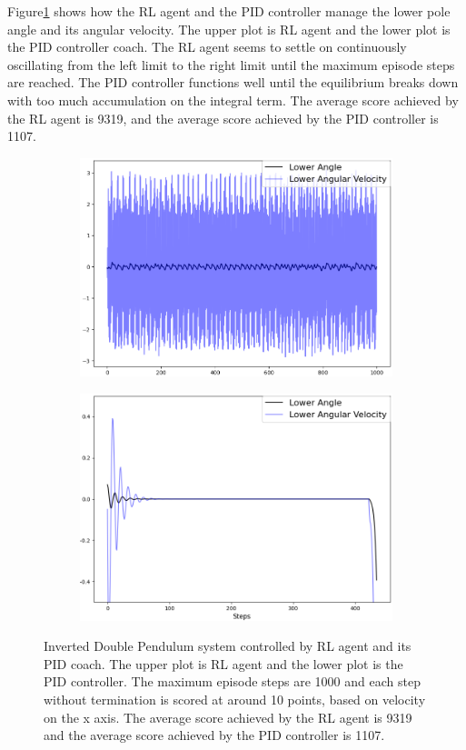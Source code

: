 \documentclass[journal]{IEEEtran}
\begin{document}
Figure\ref{fig:double} shows how the RL agent and the PID controller manage the lower pole angle and its angular velocity. The upper plot is RL agent and the lower plot is the PID controller coach. The RL agent seems to settle on continuously oscillating from the left limit to the right limit until the maximum episode steps are reached. The PID controller functions well until the equilibrium breaks down with too much accumulation on the integral term. The average score achieved by the RL agent is 9319, and the average score achieved by the PID controller is 1107.
\begin{figure}
\centering
\begin{subfigure}{0.3\textwidth}
  \centering
  \includegraphics[width=\linewidth]{double_RL.png}
\end{subfigure}%
\hfill
\begin{subfigure}{.3\textwidth}
  \centering
  \includegraphics[width=\linewidth]{double_PID.png}
\end{subfigure}
\caption{Inverted Double Pendulum system controlled by RL agent and its PID coach. The upper plot is RL agent and the lower plot is the PID controller. The maximum episode steps are 1000 and each step without termination is scored at around 10 points, based on velocity on the x axis. The average score achieved by the RL agent is 9319 and the average score achieved by the PID controller is 1107. }
\label{fig:double}
\end{figure}
\end{document}
